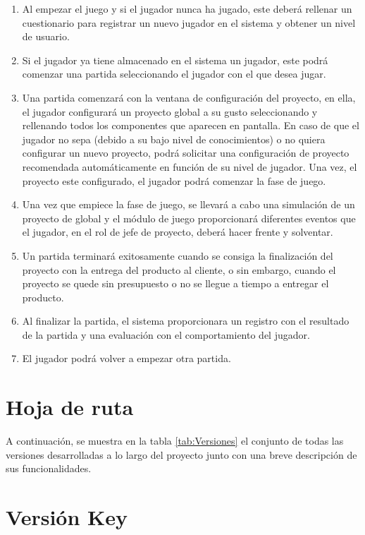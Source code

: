 \begin{enumerate}
	\item Al empezar el juego y si el jugador nunca ha jugado, este deberá rellenar un cuestionario para registrar un nuevo jugador en el sistema y obtener un nivel de usuario.
	\item Si el jugador ya tiene almacenado en el sistema un jugador, este podrá comenzar una partida seleccionando el jugador con el que desea jugar.
	\item Una partida comenzará con la ventana de configuración del proyecto, en ella, el jugador configurará un proyecto global a su gusto seleccionando y rellenando todos los componentes que aparecen en pantalla. En caso de que el jugador no sepa (debido a su bajo nivel de conocimientos) o no quiera configurar un nuevo proyecto, podrá solicitar una configuración de proyecto recomendada automáticamente en función de su nivel de jugador. Una vez, el proyecto este configurado, el jugador podrá comenzar la fase de juego.
	\item Una vez que empiece la fase de juego, se llevará a cabo una simulación de un proyecto de global y el módulo de juego proporcionará diferentes eventos que el jugador, en el rol de jefe de proyecto, deberá hacer frente y solventar.
	\item Un partida terminará exitosamente cuando se consiga la finalización del proyecto con la entrega del producto al cliente, o sin embargo, cuando el proyecto se quede sin presupuesto o no se llegue a tiempo a entregar el producto.
	\item Al finalizar la partida, el sistema proporcionara un registro con el resultado de la partida y una evaluación con el comportamiento del jugador.
	\item El jugador podrá volver a empezar otra partida.
\end{enumerate}

\section{Hoja de ruta}
\label{sec:HojaRuta}

A continuación, se muestra en la tabla \ref{tab:Versiones} el conjunto de todas las versiones desarrolladas a lo largo del proyecto junto con una breve descripción de sus funcionalidades.


\section{Versión Key}
\label{sec:VersionKey}

